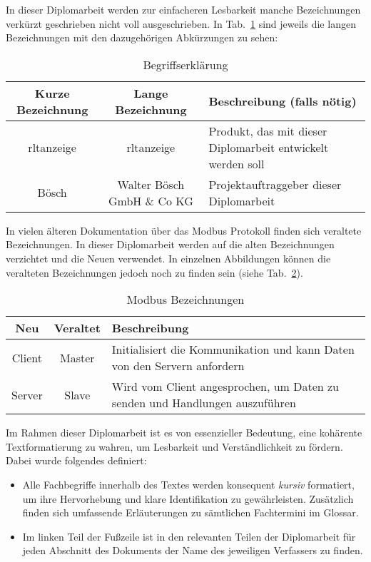 In dieser Diplomarbeit werden zur einfacheren Lesbarkeit manche Bezeichnungen verkürzt geschrieben \bzw nicht voll ausgeschrieben. In Tab.~\ref{tab:begriffserklaerung} sind jeweils die langen Bezeichnungen mit den dazugehörigen Abkürzungen zu sehen:
\begin{table}[h]
	\caption{Begriffserklärung \label{tab:begriffserklaerung}}
	\begin{tabularx}{\textwidth}{@{}c|c|X@{}}
		\toprule
		\textbf{Kurze Bezeichnung} & \textbf{Lange Bezeichnung} & \textbf{Beschreibung (falls nötig)} \\
		\midrule
		\acs{rltanzeige} & \acl{rltanzeige} &  Produkt, das mit dieser Diplomarbeit entwickelt werden soll \\
		Bösch & Walter Bösch GmbH \& Co KG & Projektauftraggeber dieser Diplomarbeit \\
		\bottomrule
	\end{tabularx}
\end{table}


In vielen älteren Dokumentation über das Modbus Protokoll finden sich veraltete Bezeichnungen. In dieser Diplomarbeit werden auf die alten Bezeichnungen verzichtet und die Neuen verwendet. In einzelnen Abbildungen können die veralteten Bezeichnungen jedoch noch zu finden sein (siehe Tab.~\ref{tab:modbus_bezeichnung}). 
\begin{table}[h]
	\caption{Modbus Bezeichnungen \label{tab:modbus_bezeichnung}}
	\begin{tabularx}{\textwidth}{@{}c|c|X@{}}
		\toprule
		\textbf{Neu} & \textbf{Veraltet} & \textbf{Beschreibung} \\
		\midrule
		Client & Master & Initialisiert die Kommunikation und kann Daten von den Servern anfordern \\
		Server & Slave & Wird vom Client angesprochen, um Daten zu senden und Handlungen auszuführen \\
		\bottomrule
	\end{tabularx}
\end{table}

Im Rahmen dieser Diplomarbeit ist es von essenzieller Bedeutung, eine kohärente Textformatierung zu wahren, um Lesbarkeit und Verständlichkeit zu fördern. Dabei wurde folgendes definiert:
\begin{itemize}
    \item Alle Fachbegriffe innerhalb des Textes werden konsequent \textit{kursiv} formatiert, um ihre Hervorhebung und klare Identifikation zu gewährleisten. Zusätzlich finden sich umfassende Erläuterungen zu sämtlichen Fachtermini im Glossar.

    \item Im linken Teil der Fußzeile ist in den relevanten Teilen der Diplomarbeit für jeden Abschnitt des Dokuments der Name des jeweiligen Verfassers zu finden.
\end{itemize}

 



